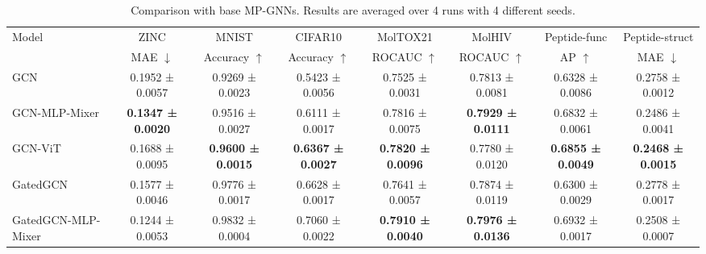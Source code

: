 \documentclass{article}
\begin{document}
\begin{table}[t]
\scriptsize
    \centering
    \caption{Comparison with base MP-GNNs. Results are averaged over 4 runs with 4 different seeds.}
     \label{tab: performance}
    \begin{tabular}{lccccccc}
    \toprule
         \multirow{2}{*}{Model} 
         &  ZINC  
         & MNIST  
         & CIFAR10  
         & MolTOX21  
         & MolHIV  
         & {Peptide-func} 
         & {Peptide-struct} 
         \\ 
         \cmidrule(lr){2-2}
         \cmidrule(lr){3-3}
         \cmidrule(lr){4-4}
         \cmidrule(lr){5-5}
         \cmidrule(lr){6-6}
         \cmidrule(lr){7-7}
         \cmidrule(lr){8-8}
         & MAE $\downarrow$ 
         & Accuracy $\uparrow$ 
         & Accuracy $\uparrow$
         & ROCAUC $\uparrow$ 
         & ROCAUC $\uparrow$ 
         & {AP $\uparrow$}  
         & {MAE $\downarrow$}\\
    \midrule
    GCN 
    & 0.1952 ± 0.0057 %
    & 0.9269 ± 0.0023 %
    & 0.5423 ± 0.0056 %
    & 0.7525 ± 0.0031 %
    & 0.7813 ± 0.0081 %
    & 0.6328 ± 0.0086 %
    & 0.2758 ± 0.0012 %
    \\
    

    {GCN-MLP-Mixer} 
    & {\bf {0.1347 ± 0.0020}} %
    & {{0.9516 ± 0.0027}}          %
    & {{0.6111 ± 0.0017}}           %
    & {{0.7816 ± 0.0075}}          %
    & {\bf{0.7929 ± 0.0111}}           %
    & {{0.6832 ± 0.0061}}          %
    & {{0.2486 ± 0.0041}}           %
    \\

    {GCN-ViT} 
    & {0.1688 ± 0.0095}    %
    & \bf{0.9600 ± 0.0015}    %
    & \bf{0.6367 ± 0.0027}    %
    & \bf{0.7820 ± 0.0096}    %
    & {0.7780 ± 0.0120}    %
    & \bf{0.6855 ± 0.0049}    %
    & \bf{0.2468 ± 0.0015}    %
    \\
    \midrule
    GatedGCN 
    & 0.1577 ± 0.0046 %
    & 0.9776 ± 0.0017 %
    & 0.6628 ± 0.0017 %
    & 0.7641 ± 0.0057 %
    & 0.7874 ± 0.0119 %
    & 0.6300 ± 0.0029 %
    & 0.2778 ± 0.0017 %
    \\
   
    
    {GatedGCN-MLP-Mixer}
    & {{0.1244 ± 0.0053}} %
    & {{0.9832 ± 0.0004}}          %
    & {{0.7060 ± 0.0022}}           %
    & {\bf{0.7910 ± 0.0040}}          %
    & {\bf{0.7976 ± 0.0136}}           %
    & {{0.6932 ± 0.0017}}          %
    & {{0.2508 ± 0.0007}}           %
    \\
    

\end{tabular}
\end{table}
\end{document}
